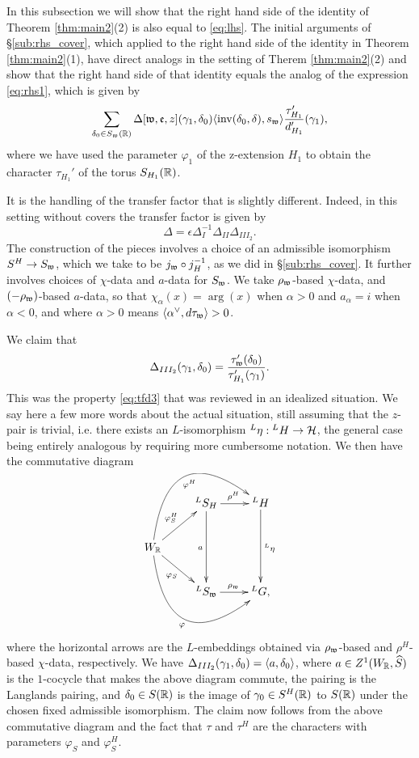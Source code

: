 \documentclass{article}
\theoremstyle{definition}
\numberwithin{equation}{section}
\renewcommand{\-}{\hyp{}}
\begin{document}
In this subsection we will show that the right hand side of the identity of Theorem \ref{thm:main2}(2) is also equal to \eqref{eq:lhs}. The initial arguments of \S\ref{sub:rhs_cover}, which applied to the right hand side of the identity in Theorem \ref{thm:main2}(1), have direct analogs in the setting of Therem \ref{thm:main2}(2) and show that the right hand side of that identity equals the analog of the expression \eqref{eq:rhs1}, which is given by
\begin{equation} \label{eq:rhs2}
\sum_{\delta_0 \in S_{\mathfrak{w}}(\mathbb{R})} \Delta[\mathfrak{w},\mathfrak{e},z](\gamma_1,\delta_0)\langle\textrm{inv}(\delta_0,\delta),s_{\mathfrak{w}}\rangle \frac{\tau'_{H_1}}{d'_{H_1}}(\gamma_1),	
\end{equation}
where we have used the parameter $\varphi_1$ of the z-extension $H_1$ to obtain the character $\tau_{H_1}'$ of the torus $S_{H_1}(\mathbb{R})$.


It is the handling of the transfer factor that is slightly different. Indeed, in this setting without covers the transfer factor is given by
\[ \Delta = \epsilon\Delta_I^{-1}\Delta_{II}\Delta_{III_2}. \]
The construction of the pieces involves a choice of an admissible isomorphism $S^H \to S_{\mathfrak{w}}$, which we take to be $j_{\mathfrak{w}}\circ j_H^{-1}$, as we did in \S\ref{sub:rhs_cover}. It further involves choices of $\chi$-data and $a$-data for $S_{\mathfrak{w}}$. We take $\rho_{\mathfrak{w}}$-based $\chi$-data, and $(-\rho_{\mathfrak{w}})$-based $a$-data, so that $\chi_\alpha(x)=\arg(x)$ when $\alpha>0$ and $a_\alpha=i$ when $\alpha<0$, and where $\alpha>0$ means $\langle\alpha^\vee,d\tau_{\mathfrak{w}}\rangle>0$.

We claim that
\[ \Delta_{III_2}(\gamma_1,\delta_0) = \frac{\tau'_{\mathfrak{w}}(\delta_0)}{\tau'_{H_1}(\gamma_1)}.\]
This was the property \eqref{eq:tfd3} that was reviewed in an idealized situation. We say here a few more words about the actual situation, still assuming that the $z$-pair is trivial, i.e. there exists an $L$\-isomorphism $^L\eta : {^LH} \to \mathcal{H}$, the general case being entirely analogous by requiring more cumbersome notation. We then have the commutative diagram
\[ \xymatrix{
	&^LS_H\ar[dd]_a\ar[r]^{\rho^H}&^LH\ar[dd]^{^L\eta}\\
	W_\R\ar[ru]^{\varphi^H_S}\ar@/^4pc/[rru]_-{\varphi^H}\ar[rd]_{\varphi_S}\ar@/_4pc/[rrd]_-{\varphi}\\
	&^LS_\mf{w}\ar[r]^{\rho_\mf{w}}&^LG,
}
\]
where the horizontal arrows are the $L$\-embeddings obtained via $\rho_{\mathfrak{w}}$-based and $\rho^H$-based $\chi$-data, respectively. We have $\Delta_{III_2}(\gamma_1,\delta_0)=\langle a,\delta_0\rangle$, where $a \in Z^1(W_{\mathbb{R}},\widehat S)$ is the $1$-cocycle that makes the above diagram commute, the pairing is the Langlands pairing, and $\delta_0 \in S(\mathbb{R})$ is the image of $\gamma_0 \in S^H(\mathbb{R})$ to $S(\mathbb{R})$ under the chosen fixed admissible isomorphism. The claim now follows from the above commutative diagram and the fact that $\tau$ and $\tau^H$ are the characters with parameters $\varphi_S$ and $\varphi_S^H$.
\end{document}
